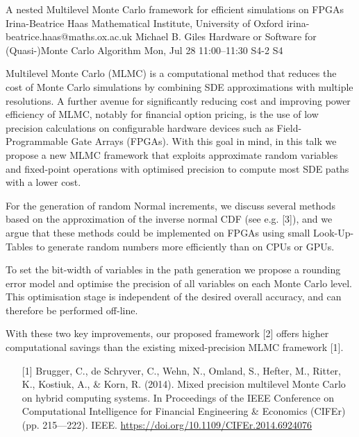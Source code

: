 \begin{talk}
  {A nested Multilevel Monte Carlo framework for efficient simulations on FPGAs}%
  {Irina-Beatrice Haas}%
  {Mathematical Institute, University of Oxford}%
  {irina-beatrice.haas@maths.ox.ac.uk}%
  {Michael B. Giles}%
  {Hardware or Software for (Quasi-)Monte Carlo Algorithm}%
  {Mon, Jul 28 11:00–11:30}%
  {S4-2}%
  {S4}%
				
			

Multilevel Monte Carlo (MLMC) is a computational method that reduces the cost of Monte Carlo simulations by combining SDE approximations with multiple resolutions. A further avenue for significantly reducing cost and improving power efficiency of MLMC, notably for financial option pricing, is the use of low precision calculations on configurable hardware devices such as Field-Programmable Gate Arrays (FPGAs). With this goal in mind, in this talk we propose a new MLMC framework that exploits approximate random variables and fixed-point operations with optimised precision to compute most SDE paths with a lower cost.

For the generation of random Normal increments, we discuss several methods based on the approximation of the inverse normal CDF (see e.g. [3]), and we argue that these methods could be implemented on FPGAs using small Look-Up-Tables to generate random numbers more efficiently than on CPUs or GPUs. 

To set the bit-width of variables in the path generation we propose a rounding error model and optimise the precision of all variables on each Monte Carlo level. This optimisation stage is independent of the desired overall accuracy, and can therefore be performed off-line. 

With these two key improvements, our proposed framework [2] offers higher computational
savings than the existing mixed-precision MLMC framework [1].


\medskip


\begin{enumerate}

    \item[{[1]}] Brugger, C., de Schryver, C., Wehn, N., Omland, S., Hefter, M., Ritter, K., Kostiuk, A., \& Korn, R. (2014). Mixed precision multilevel Monte Carlo on hybrid computing systems. In Proceedings of the IEEE Conference on Computational Intelligence for Financial Engineering \& Economics (CIFEr) (pp. 215---222). IEEE. \url{https://doi.org/10.1109/CIFEr.2014.6924076}
    

\end{enumerate}
\end{talk}
